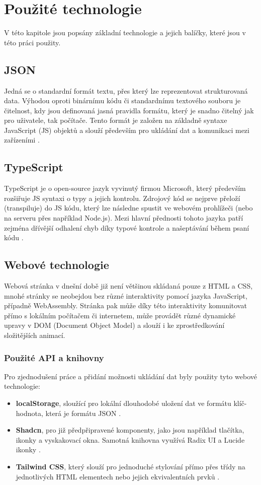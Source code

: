 \chapter{Použité technologie}
\label{sec:technologies}
V této kapitole jsou popsány základní technologie a jejich balíčky, které jsou v této práci použity.

\section{JSON}
Jedná se o standardní formát textu, přes který lze reprezentovat strukturovaná data. 
Výhodou oproti binárnímu kódu či standardnímu textového souboru je čitelnost, 
kdy jsou definovaná jasná pravidla formátu, který je snadno čitelný jak pro uživatele, tak počítače.
Tento formát je založen na základně syntaxe JavaScript (JS) objektů a slouží především pro ukládání dat a komunikaci mezi zařízeními \cite{bray_json}.

\section{TypeScript}
TypeScript je o open-source jazyk vyvinutý firmou Microsoft, který především rozšiřuje JS syntaxi o typy a jejich kontrolu.
Zdrojový kód se nejprve přeloží (transpiluje) do JS kódu, který lze následne spustit ve webovém prohlížeči (nebo na serveru přes například Node.js). 
Mezi hlavní přednosti tohoto jazyka patří zejména dřívější odhalení chyb díky typové kontrole a našeptávání během psaní kódu \cite{w3schools_typescript}.

\section{Webové technologie}
Webová stránka v dnešní době již není většinou skládaná pouze z HTML a CSS, 
mnohé stránky se neobejdou bez různé interaktivity pomocí jazyka JavaScript, případně WebAssembly.
Stránka pak může díky této interaktivity komunitovat přímo s lokálním počítačem či internetem, 
může provádět různé dynamické upravy v DOM (Document Object Model) a slouží i ke zprostředkování složitějších animací.

\subsection{Použité API a knihovny}
Pro zjednodušení práce a přidání možnosti ukládání dat byly použity tyto webové technologie:
\begin{itemize}
  \item \textbf{localStorage}, sloužící pro lokální dlouhodobé uložení dat ve formátu klíč-hodnota, která je formátu JSON \cite{mozilla_localstorage}.
  \item \textbf{Shadcn}, pro již předpřipravené komponenty, jako jsou například tlačítka, ikonky a vyskakovací okna. Samotná knihovna využívá Radix UI a Lucide ikonky \cite{shadcn_introduction}.
  \item \textbf{Tailwind CSS}, který slouží pro jednoduché stylování přímo přes třídy na jednotlivých HTML elementech nebo jejich ekvivalentních prvků \cite{tailwindcss}.
\end{itemize}

